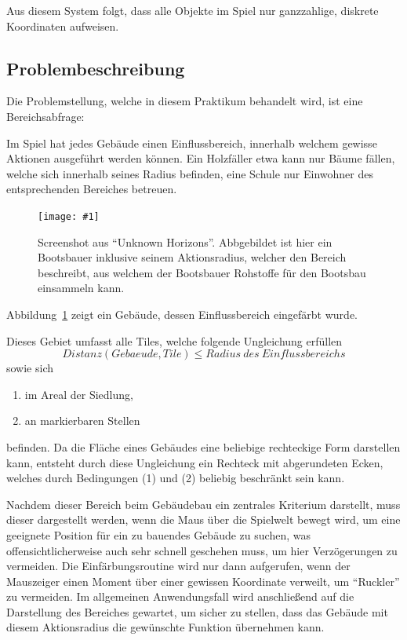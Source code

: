 \documentclass[%
			paper=a4,%
			DIV12,
			liststotoc,
			bibtotoc,
			draft=false,%
			titlepage,
			numbers=noendperiod
			]{scrartcl}
\newcommand{\myfig}[5] {
 \begin{figure}[tbph]
	 \centering
	 \texttt{[image: \#1]}
	 \caption[#4]{#5}
	 \label{fig:#2}
 \end{figure}
}
\begin{document}
Aus diesem System folgt, dass alle Objekte im Spiel nur ganzzahlige, diskrete Koordinaten aufweisen.


\subsection{Problembeschreibung}
Die Problemstellung, welche in diesem Praktikum behandelt wird, ist eine Bereichsabfrage:

Im Spiel hat jedes Gebäude einen Einflussbereich, innerhalb welchem gewisse Aktionen ausgeführt werden können.
Ein Holzfäller etwa kann nur Bäume fällen, welche sich innerhalb seines Radius befinden,
eine Schule nur Einwohner des entsprechenden Bereiches betreuen.
\myfig{img/uh-boatbuilder-overview}{boatbuilder}{width=.8\textwidth}
{Screenshot aus "`Unknown Horizons"'}
{Screenshot aus "`Unknown Horizons"'. Abbgebildet ist hier ein Bootsbauer inklusive seinem Aktionsradius, welcher den Bereich beschreibt, aus welchem der Bootsbauer Rohstoffe für den Bootsbau einsammeln kann.}
Abbildung\nolinebreak\ \ref{fig:boatbuilder} zeigt ein Gebäude, dessen Einflussbereich eingefärbt wurde.

Dieses Gebiet umfasst alle Tiles, welche folgende Ungleichung erfüllen
\begin{equation}
	Distanz(Gebaeude, Tile) \leq Radius\ des\ Einflussbereichs
\end{equation}
sowie sich
\begin{enumerate}
	\item im Areal der Siedlung,
	\item an markierbaren Stellen
\end{enumerate}
befinden.
Da die Fläche eines Gebäudes eine beliebige rechteckige Form darstellen kann, entsteht durch diese Ungleichung ein Rechteck mit abgerundeten Ecken, welches durch Bedingungen (1) und (2) beliebig beschränkt sein kann.

Nachdem dieser Bereich beim Gebäudebau ein zentrales Kriterium darstellt, muss dieser dargestellt werden, wenn die Maus über die Spielwelt bewegt wird, um eine geeignete Position für ein zu bauendes Gebäude zu suchen, was offensichtlicherweise auch sehr schnell geschehen muss, um hier Verzögerungen zu vermeiden.
Die Einfärbungsroutine wird nur dann aufgerufen, wenn der Mauszeiger einen Moment über einer gewissen Koordinate verweilt, um "`Ruckler"' zu vermeiden. Im allgemeinen Anwendungsfall wird anschließend auf die Darstellung des Bereiches gewartet, um sicher zu stellen, dass das Gebäude mit diesem Aktionsradius die gewünschte Funktion übernehmen kann.
\end{document}
